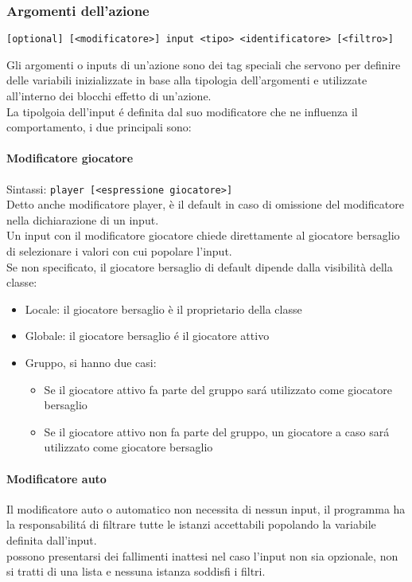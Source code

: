 \subsubsection{Argomenti dell'azione}
\begin{verbatim}
[optional] [<modificatore>] input <tipo> <identificatore> [<filtro>]
\end{verbatim}
Gli argomenti o inputs di un’azione sono dei tag speciali che servono per definire delle variabili 
inizializzate in base alla tipologia dell’argomenti e utilizzate all’interno dei 
blocchi effetto di un’azione. \\
La tipolgoia dell'input é definita dal suo modificatore che ne influenza il comportamento, 
i due principali sono:

\paragraph{Modificatore giocatore}
Sintassi: \verb|player [<espressione giocatore>]| \\
Detto anche modificatore player, è il default in caso di omissione del modificatore nella
dichiarazione di un input. \\
Un input con il modificatore giocatore chiede direttamente al giocatore bersaglio di 
selezionare i valori con cui popolare l'input. \\
Se non specificato, il giocatore bersaglio di default dipende dalla visibilità della classe:
\begin{itemize}
    \item Locale: il giocatore bersaglio è il proprietario della classe
    \item Globale: il giocatore bersaglio é il giocatore attivo 
    \item {
        Gruppo, si hanno due casi:
        \begin{itemize}
            \item Se il giocatore attivo fa parte del gruppo sará utilizzato come giocatore bersaglio
            \item Se il giocatore attivo non fa parte del gruppo, un giocatore a caso sará utilizzato come giocatore bersaglio
        \end{itemize}
    }
\end{itemize}

\paragraph{Modificatore auto}
Il modificatore auto o automatico non necessita di nessun input, il programma ha la responsabilitá di
filtrare tutte le istanzi accettabili popolando la variabile definita dall'input. \\
 possono presentarsi dei fallimenti inattesi nel caso l'input non sia opzionale,
non si tratti di una lista e nessuna istanza soddisfi i filtri.

